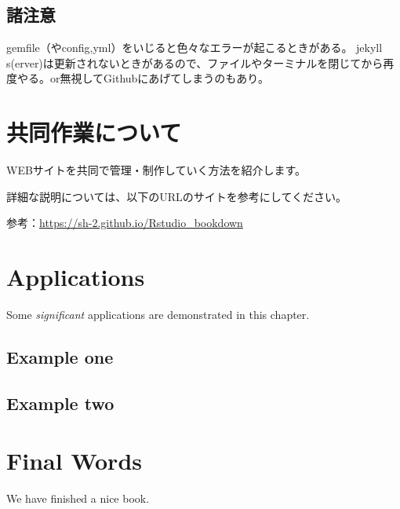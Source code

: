 \documentclass[
]{book}
\begin{document}
\hypertarget{ux8af8ux6ce8ux610f}{%
\section{諸注意}\label{ux8af8ux6ce8ux610f}}

gemfile（やconfig,yml）をいじると色々なエラーが起こるときがある。
jekyll s(erver)は更新されないときがあるので、ファイルやターミナルを閉じてから再度やる。or無視してGithubにあげてしまうのもあり。

\hypertarget{ux5171ux540cux4f5cux696dux306bux3064ux3044ux3066}{%
\chapter{共同作業について}\label{ux5171ux540cux4f5cux696dux306bux3064ux3044ux3066}}

WEBサイトを共同で管理・制作していく方法を紹介します。

詳細な説明については、以下のURLのサイトを参考にしてください。

参考：\url{https://sh-2.github.io/Rstudio_bookdown}

\hypertarget{applications}{%
\chapter{Applications}\label{applications}}

Some \emph{significant} applications are demonstrated in this chapter.

\hypertarget{example-one}{%
\section{Example one}\label{example-one}}

\hypertarget{example-two}{%
\section{Example two}\label{example-two}}

\hypertarget{final-words}{%
\chapter{Final Words}\label{final-words}}

We have finished a nice book.

  
\end{document}
